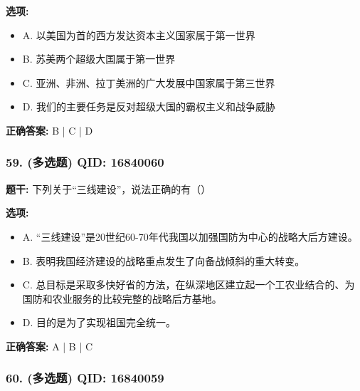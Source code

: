 \documentclass[12pt,UTF8]{ctexart}
\begin{document}
\textbf{选项:}
\begin{itemize}[leftmargin=*]

  \item A. 以美国为首的西方发达资本主义国家属于第一世界

  \item B. 苏美两个超级大国属于第一世界

  \item C. 亚洲、非洲、拉丁美洲的广大发展中国家属于第三世界

  \item D. 我们的主要任务是反对超级大国的霸权主义和战争威胁

\end{itemize}

\textbf{正确答案:}
B | C | D

\vspace{0.3em}\hrulefill\vspace{0.7em}

\subsubsection*{59. (多选题) \small QID: 16840060}

\textbf{题干:}
下列关于“三线建设”，说法正确的有（）

\textbf{选项:}
\begin{itemize}[leftmargin=*]

  \item A. “三线建设”是20世纪60-70年代我国以加强国防为中心的战略大后方建设。

  \item B. 表明我国经济建设的战略重点发生了向备战倾斜的重大转变。

  \item C. 总目标是采取多快好省的方法，在纵深地区建立起一个工农业结合的、为国防和农业服务的比较完整的战略后方基地。

  \item D. 目的是为了实现祖国完全统一。

\end{itemize}

\textbf{正确答案:}
A | B | C

\vspace{0.3em}\hrulefill\vspace{0.7em}

\subsubsection*{60. (多选题) \small QID: 16840059}
\end{document}
